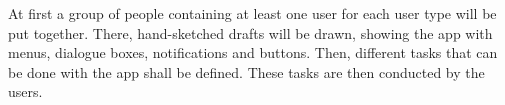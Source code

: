 At first a group of people containing at least one user for each user type will be put together.  There, hand-sketched drafts will be drawn, showing the app with menus, dialogue boxes, notifications and buttons. Then, different tasks that can be done with the app shall be defined. These tasks are then conducted by the users. 
